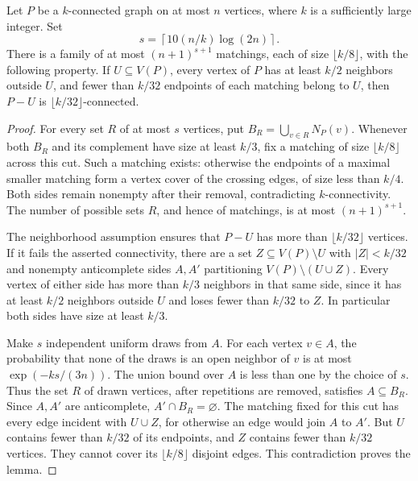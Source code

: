 \begin{lemma}\label{lem:cut-test}
Let $P$ be a $k$-connected graph on at most $n$ vertices, where $k$ is a
sufficiently large integer. Set
\[
 s=\left\lceil10(n/k)\log(2n)\right\rceil.
\]
There is a family of at most $(n+1)^{s+1}$ matchings, each of size
$\lfloor k/8\rfloor$, with the following property. If $U\subseteq V(P)$,
every vertex of $P$ has at least $k/2$ neighbors outside $U$, and fewer
than $k/32$ endpoints of each matching belong to $U$, then $P-U$ is
$\lfloor k/32\rfloor$-connected.
\end{lemma}
\begin{proof}
For every set $R$ of at most $s$ vertices, put
$B_R=\bigcup_{v\in R}N_P(v)$. Whenever both $B_R$ and its complement
have size at least $k/3$, fix a matching of size $\lfloor k/8\rfloor$
across this cut. Such a matching exists: otherwise the endpoints of a
maximal smaller matching form a vertex cover of the crossing edges,
of size less than $k/4$. Both sides remain nonempty after their removal,
contradicting $k$-connectivity. The number of possible sets $R$, and
hence of matchings, is at most $(n+1)^{s+1}$.

The neighborhood assumption ensures that $P-U$ has more than
$\lfloor k/32\rfloor$ vertices. If it fails the asserted connectivity,
there are a set $Z\subseteq V(P)\setminus U$ with $|Z|<k/32$ and
nonempty anticomplete sides $A,A'$ partitioning $V(P)\setminus(U\cup Z)$.
Every vertex of either side has more than $k/3$ neighbors in that same
side, since it has at least $k/2$ neighbors outside $U$ and loses fewer
than $k/32$ to $Z$. In particular both sides have size at least $k/3$.

Make $s$ independent uniform draws from $A$. For each vertex $v\in A$,
the probability that none of the draws is an open neighbor of $v$ is
at most $\exp(-ks/(3n))$. The union bound over $A$ is less than one by
the choice of $s$. Thus the set $R$ of drawn vertices, after repetitions
are removed, satisfies $A\subseteq B_R$. Since $A,A'$ are anticomplete,
$A'\cap B_R=\varnothing$. The matching fixed for this cut has every edge
incident with $U\cup Z$, for otherwise an edge would join $A$ to $A'$.
But $U$ contains fewer than $k/32$ of its endpoints, and $Z$ contains
fewer than $k/32$ vertices. They cannot cover its
$\lfloor k/8\rfloor$ disjoint edges. This contradiction proves the
lemma.
\end{proof}
